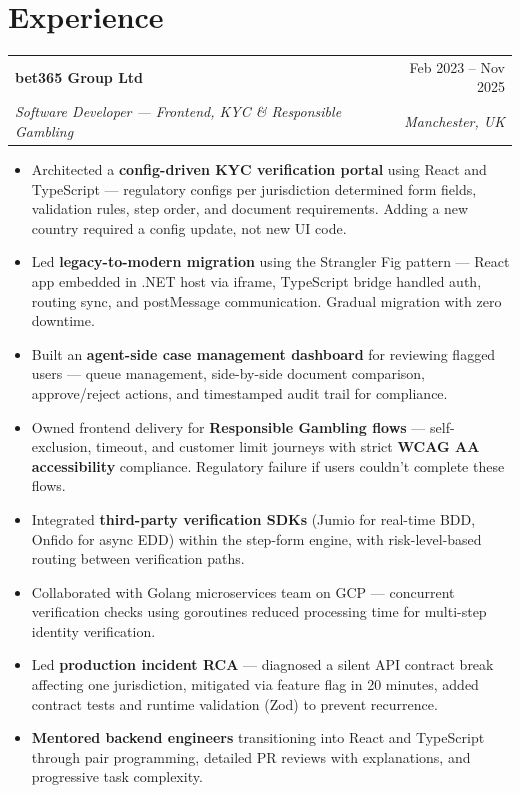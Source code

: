 \documentclass[11pt,a4paper]{article}
\makeatletter
\newcommand{\job}[4]{
\vspace{4pt}
\begin{tabular*}{\textwidth}{l@{\extracolsep{\fill}}r}
\textbf{#1} & #2 \\
\textit{#3} & \textit{#4} \\
\end{tabular*}
\vspace{2pt}
}
\makeatother
\begin{document}
\section*{Experience}

\job
{bet365 Group Ltd}
{Feb 2023 -- Nov 2025}
{Software Developer — Frontend, KYC \& Responsible Gambling}
{Manchester, UK}

\begin{itemize}
\item Architected a \textbf{config-driven KYC verification portal} using React and TypeScript — regulatory configs per jurisdiction determined form fields, validation rules, step order, and document requirements. Adding a new country required a config update, not new UI code.
\item Led \textbf{legacy-to-modern migration} using the Strangler Fig pattern — React app embedded in .NET host via iframe, TypeScript bridge handled auth, routing sync, and postMessage communication. Gradual migration with zero downtime.
\item Built an \textbf{agent-side case management dashboard} for reviewing flagged users — queue management, side-by-side document comparison, approve/reject actions, and timestamped audit trail for compliance.
\item Owned frontend delivery for \textbf{Responsible Gambling flows} — self-exclusion, timeout, and customer limit journeys with strict \textbf{WCAG AA accessibility} compliance. Regulatory failure if users couldn't complete these flows.
\item Integrated \textbf{third-party verification SDKs} (Jumio for real-time BDD, Onfido for async EDD) within the step-form engine, with risk-level-based routing between verification paths.
\item Collaborated with Golang microservices team on GCP — concurrent verification checks using goroutines reduced processing time for multi-step identity verification.
\item Led \textbf{production incident RCA} — diagnosed a silent API contract break affecting one jurisdiction, mitigated via feature flag in 20 minutes, added contract tests and runtime validation (Zod) to prevent recurrence.
\item \textbf{Mentored backend engineers} transitioning into React and TypeScript through pair programming, detailed PR reviews with explanations, and progressive task complexity.
\end{itemize}
\end{document}
